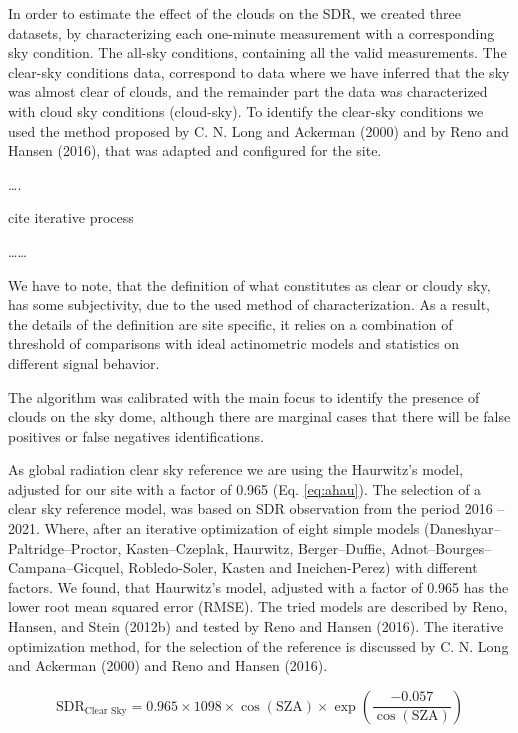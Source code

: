 \documentclass[
  preprint, 3p, authoryear]{article}
\begin{document}
In order to estimate the effect of the clouds on the SDR, we created three datasets, by characterizing each one-minute measurement with a corresponding sky condition.
The all-sky conditions, containing all the valid measurements.
The clear-sky conditions data, correspond to data where we have inferred that the sky was almost clear of clouds, and the remainder part the data was characterized with cloud sky conditions (cloud-sky).
To identify the clear-sky conditions we used the method proposed by C. N. Long and Ackerman (2000) and by Reno and Hansen (2016), that was adapted and configured for the site.

\ldots.

cite iterative process

\ldots\ldots{}

We have to note, that the definition of what constitutes as clear or cloudy sky, has some subjectivity, due to the used method of characterization.
As a result, the details of the definition are site specific, it relies on a combination of threshold of comparisons with ideal actinometric models and statistics on different signal behavior.

The algorithm was calibrated with the main focus to identify the presence of clouds on the sky dome, although there are marginal cases that there will be false positives or false negatives identifications.

As global radiation clear sky reference we are using the Haurwitz's model, adjusted for our site with a factor of 0.965 (Eq. \ref{eq:ahau}).
The selection of a clear sky reference model, was based on SDR observation from the period 2016 -- 2021.
Where, after an iterative optimization of eight simple models (Daneshyar--Paltridge--Proctor, Kasten--Czeplak, Haurwitz, Berger--Duffie, Adnot--Bourges--Campana--Gicquel, Robledo-Soler, Kasten and Ineichen-Perez) with different factors.
We found, that Haurwitz's model, adjusted with a factor of 0.965 has the lower root mean squared error (RMSE).
The tried models are described by Reno, Hansen, and Stein (2012b) and tested by Reno and Hansen (2016).
The iterative optimization method, for the selection of the reference is discussed by C. N. Long and Ackerman (2000) and Reno and Hansen (2016).

\begin{equation}
\text{SDR}_\text{Clear Sky} = 0.965 \times 1098 \times \cos( \text{SZA} ) \times \exp \left( \frac{ - 0.057}{\cos(\text{SZA})} \right) \label{eq:ahau}
\end{equation}
\end{document}
